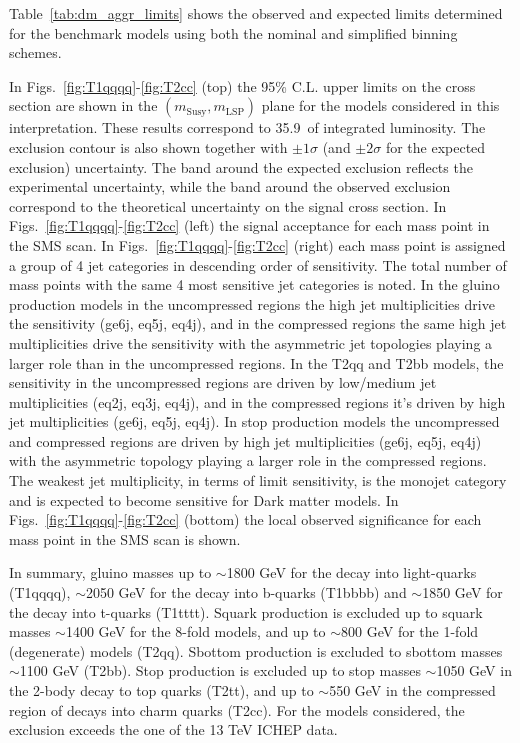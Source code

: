 Table~\ref{tab:dm_aggr_limits} shows the observed and expected limits
determined for the benchmark models using both the nominal and
simplified binning schemes. 

In Figs.~\ref{fig:T1qqqq}-\ref{fig:T2cc} (top) the 95\% C.L. upper
limits on the cross section are shown in the
$(m_{\mathrm{Susy}},m_{\mathrm{LSP}})$ plane for the models considered
in this interpretation. These results correspond to 35.9~\ifb of
integrated luminosity. The exclusion contour is also shown together
with $\pm1\sigma$ (and $\pm2\sigma$ for the expected exclusion)
uncertainty.  The band around the expected exclusion reflects the
experimental uncertainty, while the band around the observed exclusion
correspond to the theoretical uncertainty on the signal cross
section. In Figs.~\ref{fig:T1qqqq}-\ref{fig:T2cc} (left) the signal
acceptance for each mass point in the SMS scan. In
Figs.~\ref{fig:T1qqqq}-\ref{fig:T2cc} (right) each mass point is
assigned a group of 4 jet categories in descending order of
sensitivity. The total number of mass points with the same 4 most
sensitive jet categories is noted. In the gluino production models in
the uncompressed regions the high jet multiplicities drive the
sensitivity (ge6j, eq5j, eq4j), and in the compressed regions the same
high jet multiplicities drive the sensitivity with the asymmetric jet
topologies playing a larger role than in the uncompressed regions. In
the T2qq and T2bb models, the sensitivity in the uncompressed regions
are driven by low/medium jet multiplicities (eq2j, eq3j, eq4j), and in
the compressed regions it's driven by high jet multiplicities (ge6j,
eq5j, eq4j). In stop production models the uncompressed and compressed
regions are driven by high jet multiplicities (ge6j, eq5j, eq4j) with
the asymmetric topology playing a larger role in the compressed
regions.  The weakest jet multiplicity, in terms of limit sensitivity,
is the monojet category and is expected to become sensitive for Dark
matter models. In Figs.~\ref{fig:T1qqqq}-\ref{fig:T2cc} (bottom) the
local observed significance for each mass point in the SMS scan is
shown.

In summary, gluino masses up to $\sim$1800 GeV for the decay into
light-quarks (T1qqqq), $\sim$2050 GeV for the decay into b-quarks
(T1bbbb) and $\sim$1850 GeV for the decay into t-quarks
(T1tttt). Squark production is excluded up to squark masses $\sim$1400
GeV for the 8-fold models, and up to $\sim$800 GeV for the 1-fold
(degenerate) models (T2qq). Sbottom production is excluded to sbottom
masses $\sim$1100 GeV (T2bb).  Stop production is excluded up to stop
masses $\sim$1050 GeV in the 2-body decay to top quarks (T2tt), and up
to $\sim$550 GeV in the compressed region of decays into charm quarks
(T2cc).  For the models considered, the exclusion exceeds the one of
the 13 TeV ICHEP data.


